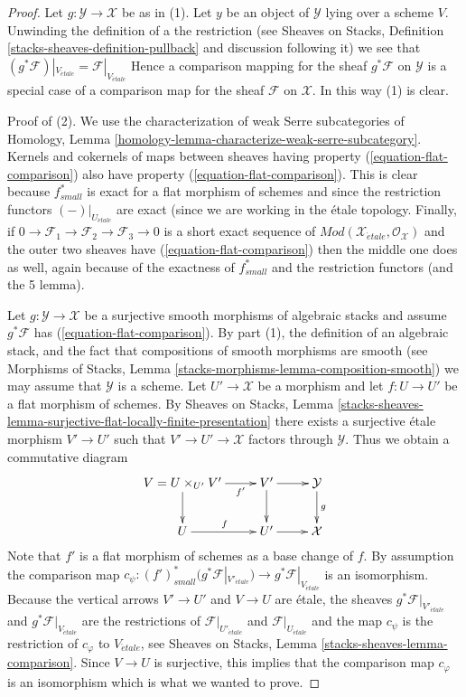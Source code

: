 \begin{proof}
Let $g : \mathcal{Y} \to \mathcal{X}$ be as in (1).
Let $y$ be an object of $\mathcal{Y}$ lying over a scheme $V$. Unwinding
the definition of a the restriction (see
Sheaves on Stacks, Definition \ref{stacks-sheaves-definition-pullback}
and discussion following it) we see that
$(g^*\mathcal{F})|_{V_{\acute{e}tale}} = \mathcal{F}|_{V_{\acute{e}tale}}$
Hence a comparison mapping for the sheaf $g^*\mathcal{F}$ on $\mathcal{Y}$
is a special case of a comparison map for the sheaf $\mathcal{F}$ on
$\mathcal{X}$. In this way (1) is clear.

\medskip\noindent
Proof of (2). We use the characterization of weak Serre subcategories of
Homology, Lemma \ref{homology-lemma-characterize-weak-serre-subcategory}.
Kernels and cokernels of
maps between sheaves having property (\ref{equation-flat-comparison})
also have property (\ref{equation-flat-comparison}). This is clear because
$f_{small}^*$ is exact for a flat morphism of schemes and since the restriction
functors $(-)|_{U_{\acute{e}tale}}$ are exact (since we are working in
the \'etale topology. Finally, if $0 \to \mathcal{F}_1 \to \mathcal{F}_2
\to \mathcal{F}_3 \to 0$ is a short exact sequence of
$\textit{Mod}(\mathcal{X}_{\acute{e}tale}, \mathcal{O}_\mathcal{X})$
and the outer two sheaves have (\ref{equation-flat-comparison}) then
the middle one does as well, again because of the exactness of
$f_{small}^*$ and the restriction functors (and the 5 lemma).

\medskip\noindent
Let $g : \mathcal{Y} \to \mathcal{X}$ be a surjective smooth
morphisms of algebraic stacks and assume $g^*\mathcal{F}$
has (\ref{equation-flat-comparison}). By part (1), the definition of
an algebraic stack, and the fact that compositions of smooth morphisms
are smooth (see
Morphisms of Stacks, Lemma \ref{stacks-morphisms-lemma-composition-smooth})
we may assume that $\mathcal{Y}$ is a scheme. Let $U' \to \mathcal{X}$
be a morphism and let $f : U \to U'$ be a flat morphism of schemes.
By Sheaves on Stacks, Lemma
\ref{stacks-sheaves-lemma-surjective-flat-locally-finite-presentation}
there exists a surjective \'etale morphism $V' \to U'$ such that
$V' \to U' \to \mathcal{X}$ factors through $\mathcal{Y}$.
Thus we obtain a commutative diagram
$$
\xymatrix{
V = U \times_{U'} V' \ar[r]_-{f'} \ar[d] &
V' \ar[r] \ar[d] & \mathcal{Y} \ar[d]^g \\
U \ar[r]^f & U' \ar[r] & \mathcal{X}
}
$$
Note that $f'$ is a flat morphism of schemes as a base change of $f$.
By assumption the comparison map
$c_\psi : (f')_{small}^*\big(g^*\mathcal{F}|_{V'_{\acute{e}tale}}\big)
\to g^*\mathcal{F}|_{V_{\acute{e}tale}}$ is an isomorphism.
Because the vertical arrows $V' \to U'$ and $V \to U$ are \'etale,
the sheaves $g^*\mathcal{F}|_{V'_{\acute{e}tale}}$ and
$g^*\mathcal{F}|_{V_{\acute{e}tale}}$ are the restrictions of
$\mathcal{F}|_{U'_{\acute{e}tale}}$ and $\mathcal{F}|_{U_{\acute{e}tale}}$
and the map $c_\psi$ is the restriction of $c_\varphi$ to
$V_{\acute{e}tale}$, see
Sheaves on Stacks, Lemma \ref{stacks-sheaves-lemma-comparison}.
Since $V \to U$ is surjective, this implies
that the comparison map $c_\varphi$ is an isomorphism which is what
we wanted to prove.
\end{proof}

